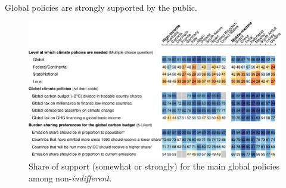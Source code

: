 \documentclass[aspectratio=169,xcolor=dvipsnames, 11pt,mathserif]{beamer}
\begin{document}


\begin{frame}{Global policies are strongly supported by the public.\label{global_policies}}
	\vspace{-.3cm}
	\begin{figure}[h!]
		\centering		
		\caption{Share of support (somewhat or strongly) for the main global policies among non-\textit{indifferent}.  \hyperlink{national_policies}{} \hyperlink{national_policies}{}%
        }
        \vspace{-.2cm}
		\includegraphics[height=.9\textheight]{../figures/OECD/Heatplot_global_tax_attitudes_share.pdf} %
		\end{figure}
\end{frame}
\end{document}

